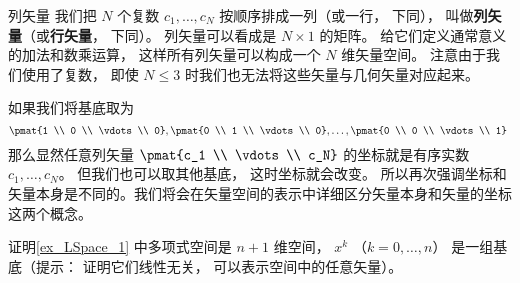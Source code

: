 
\begin{exercise}{列矢量}
我们把 $N$ 个复数 $c_1, \dots, c_N$ 按顺序排成一列（或一行， 下同）， 叫做\textbf{列矢量}（或\textbf{行矢量}， 下同）。 列矢量可以看成是 $N \times 1$ 的矩阵。 给它们定义通常意义的加法和数乘运算， 这样所有列矢量可以构成一个 $N$ 维矢量空间。 注意由于我们使用了复数， 即使 $N \leqslant 3$ 时我们也无法将这些矢量与几何矢量对应起来。

如果我们将基底取为
$$
\pmat{1 \\ 0 \\ \vdots \\ 0}, \pmat{0 \\ 1 \\ \vdots \\ 0}, \dots, \pmat{0 \\ 0 \\ \vdots \\ 1}~
$$
那么显然任意列矢量 $\pmat{c_1 \\ \vdots \\ c_N}$ 的坐标就是有序实数 $c_1, \dots, c_N$。 但我们也可以取其他基底， 这时坐标就会改变。 所以再次强调坐标和矢量本身是不同的。我们将会在矢量空间的表示中详细区分矢量本身和矢量的坐标这两个概念。
\end{exercise}

\begin{exercise}{}
证明\autoref{ex_LSpace_1} 中多项式空间是 $n+1$ 维空间， $x^k$ （$k = 0, \dots, n$） 是一组基底（提示： 证明它们线性无关， 可以表示空间中的任意矢量）。
\end{exercise}






